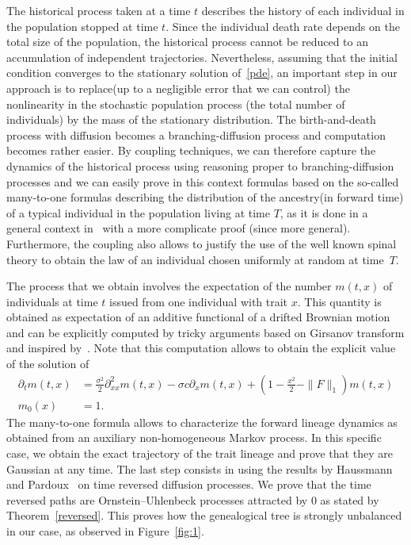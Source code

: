 \documentclass[10pt]{amsart}
\theoremstyle{definition}\newtheorem{defi}[theo]{Definition}\newtheorem{rema}[theo]{Remark}\newtheorem{exam}[theo]{Example}\newtheorem{exem}[theo]{Example}\newtheorem{nota}[theo]{Notation}
\begin{document}
The historical process taken at a time $t$ describes the history of each individual in the population stopped at time $t$. Since the individual death rate depends on the total size of the population, the historical process cannot be reduced to an accumulation of independent trajectories. Nevertheless, assuming that the initial condition converges to the stationary solution of~\eqref{pde}, an important step in our approach is to replace\linebreak (up to a negligible error that we can control) the nonlinearity in the stochastic population process (the total number of individuals) by the mass of the stationary distribution. The birth-and-death process with diffusion becomes a branching-diffusion process and computation becomes rather easier. By coupling techniques, we can therefore capture the dynamics of the historical process using reasoning proper to branching-diffusion processes and we can easily prove in this context formulas based on the so-called many-to-one formulas describing the distribution of the ancestry\linebreak (in forward time) of a typical individual in the population living at time $T$, as it is done in a general context in~\cite{Marguet2} with a more complicate proof (since more general). Furthermore, the coupling also allows to justify the use of the well known spinal theory to obtain the law of an individual chosen uniformly at random at time~$T$.



The process that we obtain involves the expectation of the number $m(t,x)$ of individuals at time $t$ issued from one individual with trait $x$. This quantity is obtained as expectation of an additive functional of a drifted Brownian motion and can be explicitly computed by tricky arguments based on Girsanov transform and inspired by~\cite{fitzsimmons1993markovian}. Note that this computation allows to obtain the explicit value of the solution of
\begin{equation}\label{eq:m-intro}
\begin{split}
\partial_{t} m{(t,x)} &=\frac{\sigma^2}{2}\partial^2_{xx}m{(t,x)}-\sigma c\partial_{x}m{(t,x)}+\left (1-\frac{x^2}{2}-\|F\|_1\right)m{(t,x)} 
\\
m_{0}(x) &=1.
\end{split}
\end{equation}
The many-to-one formula allows to characterize the forward lineage dynamics as obtained from an auxiliary non-homogeneous Markov process. In this specific case, we obtain the exact trajectory of the trait lineage and prove that they are Gaussian at any time. The last step consists in using the results by Haussmann and Pardoux~\cite{haussmannpardoux} on time reversed diffusion processes. We prove that the time reversed paths are Ornstein--Uhlenbeck processes attracted by $0$ as stated by Theorem~\ref{reversed}. This proves how the genealogical tree is strongly unbalanced in our case, as observed in Figure~\ref{fig:1}.
\end{document}
